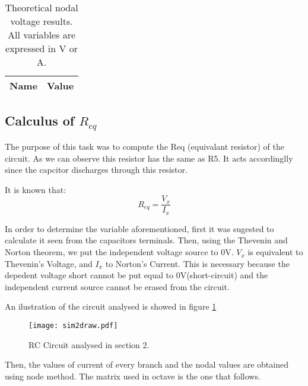 \begin{table}[ht]
  \centering
  \begin{tabular}{|l|r|}
    \hline    
    {\bf Name} & {\bf Value} \\ \hline
    
  \end{tabular}
  \caption{Theoretical nodal voltage results. All variables are expressed in V or A.}
  \label{tab:p2}
\end{table}


\subsection{Calculus of $R_{eq}$}
\label{subsection:2.2}

\par The purpose of this task was to compute the Req (equivalant resistor) of the circuit. As we can observe this resistor has the same as R5. It acts accordinglly since the capcitor discharges through this resistor.

It is known that:
\begin{equation}
R_{eq}=\frac{V_{x}}{I_{x}}
\end{equation}

In order to determine the variable aforementioned, first it was sugested to calculate it seen from the capacitors terminals. Then, using the Thevenin and Norton theorem, we put the independent voltage source to 0V. $V_{x}$ is equivalent to Thevenin's Voltage, and $I_{x}$ to Norton's Current. This is necessary because the depedent voltage short cannot be put equal to 0V(short-circuit) and the independent current source cannot be erased from the circuit.
\par An ilustration of the circuit analysed is showed in figure \ref{sim2draw} 
\begin{figure}[h] \centering
\texttt{[image: sim2draw.pdf]}
\caption{RC Circuit analysed in section 2.}
\label{sim2draw}
\end{figure}
\par
Then, the values of current of  every branch and the nodal values are obtained using node method. The matrix used in octave is the one that follows.

